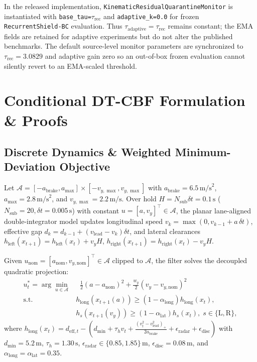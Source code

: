 \documentclass[journal]{IEEEtran}
\begin{document}
In the released implementation, \texttt{KinematicResidualQuarantineMonitor} is instantiated with \texttt{base\_tau=$\tau_{\text{rec}}$} and \texttt{adaptive\_k=0.0} for frozen \texttt{RecurrentShield-BC} evaluation. Thus $\tau_{\text{adaptive}}=\tau_{\text{rec}}$ remains constant; the EMA fields are retained for adaptive experiments but do not alter the published benchmarks. The default source-level monitor parameters are synchronized to $\tau_{\text{rec}}=3.0829$ and adaptive gain zero so an out-of-box frozen evaluation cannot silently revert to an EMA-scaled threshold.

\section{Conditional DT-CBF Formulation \& Proofs}

\subsection{Discrete Dynamics \& Weighted Minimum-Deviation Objective}
Let $\mathcal{A} = [-a_{\text{brake}}, a_{\max}] \times [-v_{y,\max}, v_{y,\max}]$ with $a_{\text{brake}}=6.5\,\text{m/s}^2$, $a_{\max}=2.8\,\text{m/s}^2$, and $v_{y,\max}=2.2\,\text{m/s}$. Over hold $H = N_{\text{sub}}\delta t = 0.1\,\text{s}$ ($N_{\text{sub}}=20, \delta t=0.005\,\text{s}$) with constant $u=[a, v_y]^\top \in \mathcal{A}$, the planar lane-aligned double-integrator model updates longitudinal speed $v_k = \max(0, v_{k-1} + a\,\delta t)$, effective gap $d_k = d_{k-1} + (v_{\text{lead}} - v_k)\delta t$, and lateral clearances $h_{\text{left}}(x_{t+1}) = h_{\text{left}}(x_t) + v_y H$, $h_{\text{right}}(x_{t+1}) = h_{\text{right}}(x_t) - v_y H$.

Given $u_{\text{nom}} = [a_{\text{nom}}, v_{y,\text{nom}}]^\top \in \mathcal{A}$ clipped to $\mathcal{A}$, the filter solves the decoupled quadratic projection:
\begin{align}
u_t^* = \arg\min_{u \in \mathcal{A}} &\;\; \frac{1}{2}(a - a_{\text{nom}})^2 + \frac{w_y}{2}(v_y - v_{y,\text{nom}})^2 \label{eq:qp_obj}\\
\text{s.t.}\quad & h_{\text{long}}(x_{t+1}(a)) \ge (1-\alpha_{\text{long}})h_{\text{long}}(x_t), \label{eq:long_con}\\
& h_s(x_{t+1}(v_y)) \ge (1-\alpha_{\text{lat}})h_s(x_t),\; s{\in}\{\text{L},\text{R}\}, \label{eq:lat_con}
\end{align}
where $h_{\text{long}}(x_t) = d_{\text{eff},t} - (d_{\min} + \tau_h v_t + \frac{(v_t^2 - v_{\text{lead}}^2)_+}{2a_{\text{brake}}} + \epsilon_{\text{radar}} + \epsilon_{\text{disc}})$ with $d_{\min}=5.2\,\text{m}$, $\tau_h=1.30\,\text{s}$, $\epsilon_{\text{radar}}\in\{0.85,1.85\}\,\text{m}$, $\epsilon_{\text{disc}}=0.08\,\text{m}$, and $\alpha_{\text{long}}=\alpha_{\text{lat}}=0.35$.
\end{document}
